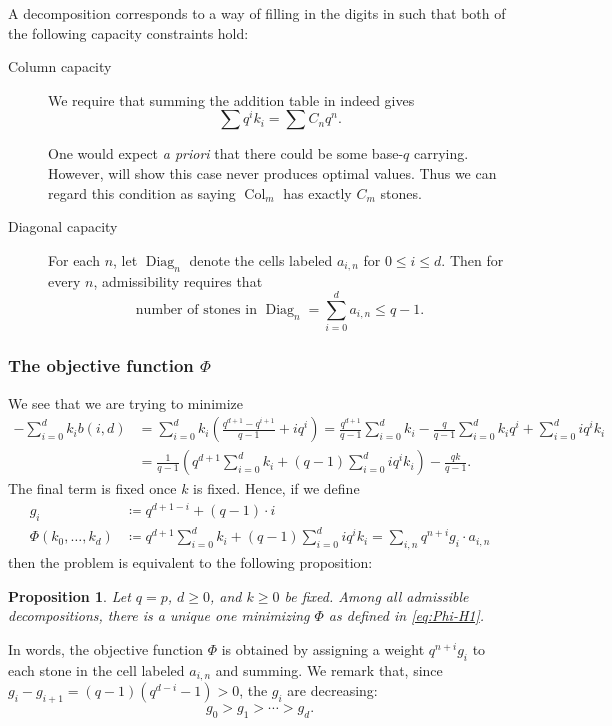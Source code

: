 \documentclass[11pt]{amsart}
\newtheorem{proposition}[theorem]{Proposition}
\theoremstyle{definition}
\theoremstyle{remark}
\DeclareMathOperator{\Col}{Col}
\DeclareMathOperator{\Diag}{Diag}
\begin{document}
A decomposition corresponds to a way of filling in the digits in
 such that both of the following
capacity constraints hold:
\begin{description}
  \item[Column capacity] We require that summing the addition table in 
    indeed gives
    \[ \sum q^i k_i = \sum C_n q^n. \]

    One would expect \emph{a priori} that there could be some base-$q$ carrying.
    However,  will show this case never produces
    optimal values.
    Thus we can regard this condition as saying $\Col_m$ has exactly $C_m$ stones.

  \item[Diagonal capacity]
    For each $n$, let $\Diag_n$ denote the cells labeled $a_{i,n}$ for $0 \le i \le d$.
    Then for every $n$, admissibility requires that
    \begin{equation} \label{eq:source-capacity-H1}
      \text{number of stones in } \Diag_n = \sum_{i=0}^d a_{i,n} \leq q-1.
    \end{equation}
\end{description}

\subsubsection{The objective function $\Phi$}
We see that we are trying to minimize
\begin{align*}
  -\sum_{i=0}^d k_i b(i,d)
  &=\sum_{i=0}^d k_i\left(\frac{q^{d+1}-q^{i+1}}{q-1}+iq^i\right)
  =\frac{q^{d+1}}{q-1}\sum_{i=0}^d k_i
    -\frac{q}{q-1}\sum_{i=0}^d k_iq^i+
     \sum_{i=0}^d iq^ik_i\\
  &=\frac{1}{q-1}
  \left( q^{d+1}\sum_{i=0}^d k_i+(q-1)\sum_{i=0}^d iq^ik_i \right)
  -\frac{qk}{q-1}.
\end{align*}
The final term is fixed once $k$ is fixed.
Hence, if we define
\begin{equation}\label{eq:Phi-H1}
  \begin{aligned}
    g_i &\coloneq q^{d+1-i} + (q-1) \cdot i \\
    \Phi(k_0,\ldots,k_d) &\coloneq q^{d+1}\sum_{i=0}^d k_i+(q-1)\sum_{i=0}^d iq^ik_i
    = \sum_{i,n} q^{n+i} g_i \cdot a_{i,n}
  \end{aligned}
\end{equation}
then the problem is equivalent to the following proposition:
\begin{proposition}\label{prop:H1-optimization}
  Let $q=p$, $d\geq 0$, and $k\geq 0$ be fixed.
  Among all admissible decompositions, there is a unique one minimizing $\Phi$
  as defined in \eqref{eq:Phi-H1}.
\end{proposition}
In words, the objective function $\Phi$
is obtained by assigning a weight $q^{n+i} g_i$ to each stone
in the cell labeled $a_{i,n}$ and summing.
We remark that, since $g_i-g_{i+1}=(q-1)(q^{d-i}-1)>0$, the $g_i$ are decreasing:
\begin{equation}\label{eq:g-decreasing-H1}
  g_0>g_1>\cdots>g_d.
\end{equation}
\end{document}
